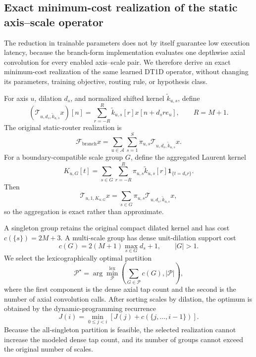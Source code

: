 \subsection{Exact minimum-cost realization of the static axis--scale operator}

The reduction in trainable parameters does not by itself guarantee low execution
latency, because the branch-form implementation evaluates one depthwise axial
convolution for every enabled axis--scale pair. We therefore derive an exact
minimum-cost realization of the same learned DT1D operator, without changing its
parameters, training objective, routing rule, or hypothesis class.

For axis $u$, dilation $d_s$, and normalized shifted kernel
$\widetilde{k}_{u,s}$, define
\begin{equation}
(\mathcal{T}_{u,d_s,\widetilde{k}_{u,s}}x)[n]
=
\sum_{r=-R}^{R}\widetilde{k}_{u,s}[r]
 x[n+d_s r e_u],
\qquad R=M+1.
\end{equation}
The original static-router realization is
\begin{equation}
\mathcal{F}_{\mathrm{branch}}x
=
\sum_{u\in\mathcal{A}}\sum_{s=1}^{S}
\pi_{u,s}\mathcal{T}_{u,d_s,\widetilde{k}_{u,s}}x.
\end{equation}
For a boundary-compatible scale group $G$, define the aggregated Laurent kernel
\begin{equation}
K_{u,G}[t]
=
\sum_{s\in G}\sum_{r=-R}^{R}
\pi_{u,s}\widetilde{k}_{u,s}[r]
\mathbf{1}_{\{t=d_s r\}}.
\end{equation}
Then
\begin{equation}
\mathcal{T}_{u,1,K_{u,G}}x
=
\sum_{s\in G}
\pi_{u,s}\mathcal{T}_{u,d_s,\widetilde{k}_{u,s}}x,
\end{equation}
so the aggregation is exact rather than approximate.

A singleton group retains the original compact dilated kernel and has cost
$c(\{s\})=2M+3$. A multi-scale group has dense unit-dilation support cost
\begin{equation}
c(G)=2(M+1)\max_{s\in G}d_s+1,
\qquad |G|>1.
\end{equation}
We select the lexicographically optimal partition
\begin{equation}
\mathcal{P}^{\star}
=
\arg\min_{\mathcal{P}}^{\mathrm{lex}}
\left(
\sum_{G\in\mathcal{P}}c(G),
|\mathcal{P}|
\right),
\end{equation}
where the first component is the dense axial tap count and the second is the
number of axial convolution calls. After sorting scales by dilation, the optimum
is obtained by the dynamic-programming recurrence
\begin{equation}
J(i)=\min_{0\le j<i}
\left[J(j)+c(\{j,\ldots,i-1\})\right].
\end{equation}
Because the all-singleton partition is feasible, the selected realization cannot
increase the modeled dense tap count, and its number of groups cannot exceed the
original number of scales.

